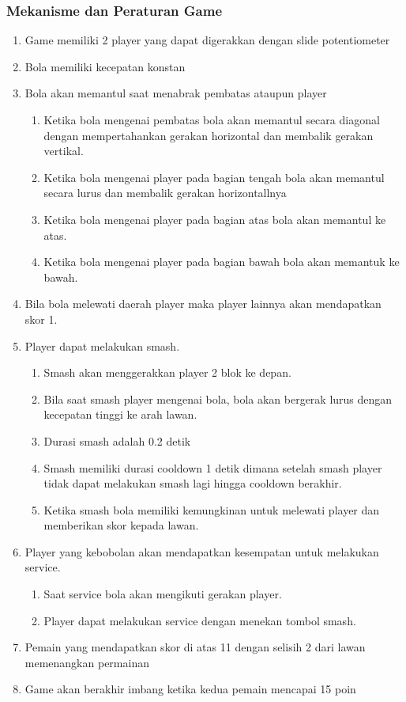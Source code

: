 \documentclass[a4paper,12pt]{article}
\begin{document}
\subsubsection{Mekanisme dan Peraturan Game}
\begin{enumerate}
    \item Game memiliki 2 player yang dapat digerakkan dengan slide potentiometer
    \item Bola memiliki kecepatan konstan
    \item Bola akan memantul saat menabrak pembatas ataupun player
        \begin{enumerate}
            \item Ketika bola mengenai pembatas bola akan memantul secara diagonal dengan mempertahankan gerakan horizontal
                dan membalik gerakan vertikal.
            \item Ketika bola mengenai player pada bagian tengah bola akan memantul secara lurus dan membalik
                gerakan horizontallnya
            \item Ketika bola mengenai player pada bagian atas bola akan memantul ke atas.
            \item Ketika bola mengenai player pada bagian bawah bola akan memantuk ke bawah.
        \end{enumerate}
    \item Bila bola melewati daerah player maka player lainnya akan mendapatkan skor 1.
    \item Player dapat melakukan smash.
        \begin{enumerate}
            \item Smash akan menggerakkan player 2 blok ke depan.
            \item Bila saat smash player mengenai bola, bola akan bergerak lurus dengan kecepatan tinggi
                ke arah lawan.
            \item Durasi smash adalah 0.2 detik
            \item Smash memiliki durasi cooldown 1 detik dimana setelah smash player tidak dapat melakukan smash lagi hingga cooldown berakhir.
            \item Ketika smash bola memiliki kemungkinan untuk melewati player dan memberikan
                skor kepada lawan.
        \end{enumerate}
    \item Player yang kebobolan akan mendapatkan kesempatan untuk melakukan service.
        \begin {enumerate}
            \item Saat service bola akan mengikuti gerakan player.
            \item Player dapat melakukan service dengan menekan tombol smash.
        \end {enumerate}
    \item Pemain yang mendapatkan skor di atas 11 dengan selisih 2 dari lawan memenangkan permainan
    \item Game akan berakhir imbang ketika kedua pemain mencapai 15 poin
\end{enumerate}
\end{document}
